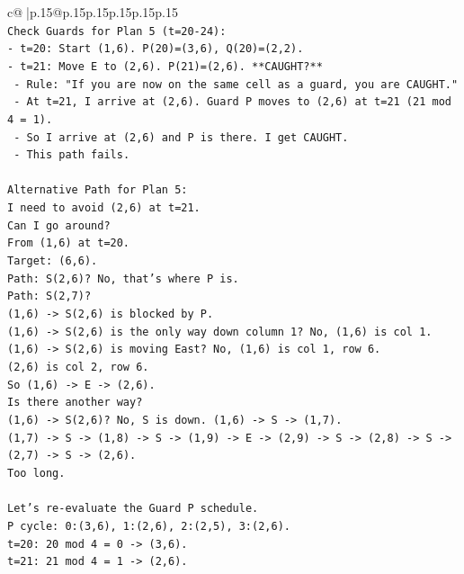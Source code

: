 \documentclass{article}
\begin{document}
{\begin{supertabular}{c@{$\;$}|p{.15\linewidth}@{}p{.15\linewidth}p{.15\linewidth}p{.15\linewidth}p{.15\linewidth}p{.15\linewidth}}
{{{\\ 
\texttt{Check Guards for Plan 5 (t=20{-}24):} \\
\texttt{{-} t=20: Start (1,6). P(20)=(3,6), Q(20)=(2,2).} \\
\texttt{{-} t=21: Move E to (2,6). P(21)=(2,6). **CAUGHT?**} \\
\texttt{  {-} Rule: "If you are now on the same cell as a guard, you are CAUGHT."} \\
\texttt{  {-} At t=21, I arrive at (2,6). Guard P moves to (2,6) at t=21 (21 mod 4 = 1).} \\
\texttt{  {-} So I arrive at (2,6) and P is there. I get CAUGHT.} \\
\texttt{  {-} This path fails.} \\
\\ 
\texttt{Alternative Path for Plan 5:} \\
\texttt{I need to avoid (2,6) at t=21.} \\
\texttt{Can I go around?} \\
\texttt{From (1,6) at t=20.} \\
\texttt{Target: (6,6).} \\
\texttt{Path: S(2,6)? No, that's where P is.} \\
\texttt{Path: S(2,7)?} \\
\texttt{(1,6) {-}> S(2,6) is blocked by P.} \\
\texttt{(1,6) {-}> S(2,6) is the only way down column 1? No, (1,6) is col 1.} \\
\texttt{(1,6) {-}> S(2,6) is moving East? No, (1,6) is col 1, row 6.} \\
\texttt{(2,6) is col 2, row 6.} \\
\texttt{So (1,6) {-}> E {-}> (2,6).} \\
\texttt{Is there another way?} \\
\texttt{(1,6) {-}> S(2,6)? No, S is down. (1,6) {-}> S {-}> (1,7).} \\
\texttt{(1,7) {-}> S {-}> (1,8) {-}> S {-}> (1,9) {-}> E {-}> (2,9) {-}> S {-}> (2,8) {-}> S {-}> (2,7) {-}> S {-}> (2,6).} \\
\texttt{Too long.} \\
\\ 
\texttt{Let's re{-}evaluate the Guard P schedule.} \\
\texttt{P cycle: 0:(3,6), 1:(2,6), 2:(2,5), 3:(2,6).} \\
\texttt{t=20: 20 mod 4 = 0 {-}> (3,6).} \\
\texttt{t=21: 21 mod 4 = 1 {-}> (2,6).} \\
}}}
\end{supertabular}}
\end{document}
